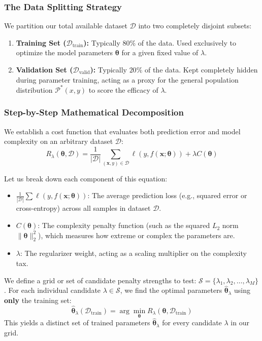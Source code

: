 \documentclass{article}
\begin{document}
\subsubsection{The Data Splitting Strategy}
We partition our total available dataset $\mathcal{D}$ into two completely disjoint subsets:
\begin{enumerate}
    \item \textbf{Training Set ($\mathcal{D}_{\text{train}}$):} Typically $80\%$ of the data. Used exclusively to optimize the model parameters $\boldsymbol{\theta}$ for a given fixed value of $\lambda$.
    \item \textbf{Validation Set ($\mathcal{D}_{\text{valid}}$):} Typically $20\%$ of the data. Kept completely hidden during parameter training, acting as a proxy for the general population distribution $\mathcal{P}^*(x,y)$ to score the efficacy of $\lambda$.
\end{enumerate}

\subsubsection{Step-by-Step Mathematical Decomposition}

We establish a cost function that evaluates both prediction error and model complexity on an arbitrary dataset $\mathcal{D}$:
\begin{equation}
R_\lambda(\boldsymbol{\theta}, \mathcal{D}) = \frac{1}{|\mathcal{D}|} \sum_{(\mathbf{x},y) \in \mathcal{D}} \ell(y, f(\mathbf{x}; \boldsymbol{\theta})) + \lambda C(\boldsymbol{\theta})
\end{equation}

Let us break down each component of this equation:
\begin{itemize}
    \item $\frac{1}{|\mathcal{D}|} \sum \ell(y, f(\mathbf{x}; \boldsymbol{\theta}))$: The average prediction loss (e.g., squared error or cross-entropy) across all samples in dataset $\mathcal{D}$.
    \item $C(\boldsymbol{\theta})$: The complexity penalty function (such as the squared $L_2$ norm $\|\boldsymbol{\theta}\|_2^2$), which measures how extreme or complex the parameters are.
    \item $\lambda$: The regularizer weight, acting as a scaling multiplier on the complexity tax.
\end{itemize}

We define a grid or set of candidate penalty strengths to test: $\mathcal{S} = \{\lambda_1, \lambda_2, \dots, \lambda_M\}$. For each individual candidate $\lambda \in \mathcal{S}$, we find the optimal parameters $\hat{\boldsymbol{\theta}}_\lambda$ using \textbf{only} the training set:
\begin{equation}
\hat{\boldsymbol{\theta}}_\lambda(\mathcal{D}_{\text{train}}) = \arg\min_{\boldsymbol{\theta}} R_\lambda(\boldsymbol{\theta}, \mathcal{D}_{\text{train}})
\end{equation}
This yields a distinct set of trained parameters $\hat{\boldsymbol{\theta}}_\lambda$ for every candidate $\lambda$ in our grid.
\end{document}
